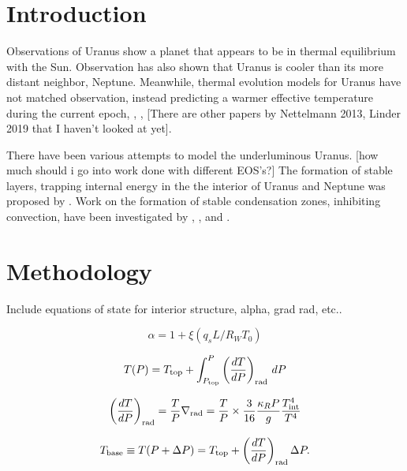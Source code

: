 \documentclass[11pt]{ucscthesisbs}
\begin{document}
\chapter{Introduction}
Observations of Uranus show a planet that appears to be in thermal equilibrium with the Sun. Observation has also shown that Uranus is cooler than its more distant neighbor, Neptune. Meanwhile, thermal evolution models for Uranus have not matched observation, instead predicting a warmer effective temperature during the current epoch\citep{fortney_2011}, \citep{podolak_1991}, \citep{hubbard_1995}, \citep{scheibe_2019} [There are other papers by Nettelmann 2013, Linder 2019 that I haven't looked at yet]. 

There have been various attempts to model the underluminous Uranus. [how much should i go into work done with different EOS's?] The formation of stable layers, trapping internal energy in the the interior of Uranus and Neptune was proposed by \citep{podolak_1991}. Work on the formation of stable condensation zones, inhibiting convection, have been investigated by \citep{friedson_2017}, \citep{leconte_2017}, and \citep{guillot_1995}. 


\chapter{Methodology}

Include equations of state for interior structure, alpha, grad rad, etc..


\begin{equation}
  \alpha = 1 + \xi (q_{s} L / R_{W} T_{0}) 
\end{equation}

\begin{equation}
	T(P) = T_{\rm top} + \int_{P_{\rm top}}^P\left(\frac{dT}{dP}\right)_{\rm rad}\,d P
\end{equation}

\begin{equation}
  \left(\frac{dT}{dP}\right)_{\rm rad}=\frac{T}{P}\nabla_{\rm rad} = \frac{T}{P}\times\frac{3}{16}\frac{\kappa_R P}{g}\frac{T_{\rm int}^4}{T^4}
\end{equation}

\begin{equation}
	T_{\rm base}\equiv T(P+\Delta P) = T_{\rm top} + \left(\frac{dT}{dP}\right)_{\rm rad}\Delta P.
\end{equation}
\end{document}

